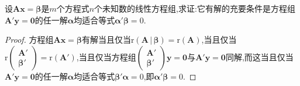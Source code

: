 \documentclass[../../main.tex]{subfiles}%
\begin{document}
\begin{example}
设\(\boldsymbol{A}\boldsymbol{x}=\boldsymbol{\beta}\)是\(m\)个方程式\(n\)个未知数的线性方程组,求证:它有解的充要条件是方程组\(\boldsymbol{A}'\boldsymbol{y}=\boldsymbol{0}\)的任一解\(\boldsymbol{\alpha}\)均适合等式\(\boldsymbol{\alpha}'\boldsymbol{\beta}=0\).
\end{example}
\begin{proof}
方程组\(\boldsymbol{A}\boldsymbol{x}=\boldsymbol{\beta}\)有解当且仅当\(\mathrm{r}\left( \boldsymbol{A}\,|\,\boldsymbol{\beta } \right) =\mathrm{r}(\boldsymbol{A})\),当且仅当\(\mathrm{r}\begin{pmatrix}
\boldsymbol{A}'\\
\boldsymbol{\beta}'
\end{pmatrix}=\mathrm{r}(\boldsymbol{A}')\),当且仅当方程组\(\begin{pmatrix}
\boldsymbol{A}'\\
\boldsymbol{\beta}'
\end{pmatrix}\boldsymbol{y}=\boldsymbol{0}\)与\(\boldsymbol{A}'\boldsymbol{y}=\boldsymbol{0}\)同解,而这当且仅当\(\boldsymbol{A}'\boldsymbol{y}=\boldsymbol{0}\)的任一解\(\boldsymbol{\alpha}\)均适合等式\(\boldsymbol{\beta}'\boldsymbol{\alpha}=0\),即\(\boldsymbol{\alpha}'\boldsymbol{\beta}=0\).
\end{proof}
\end{document}
